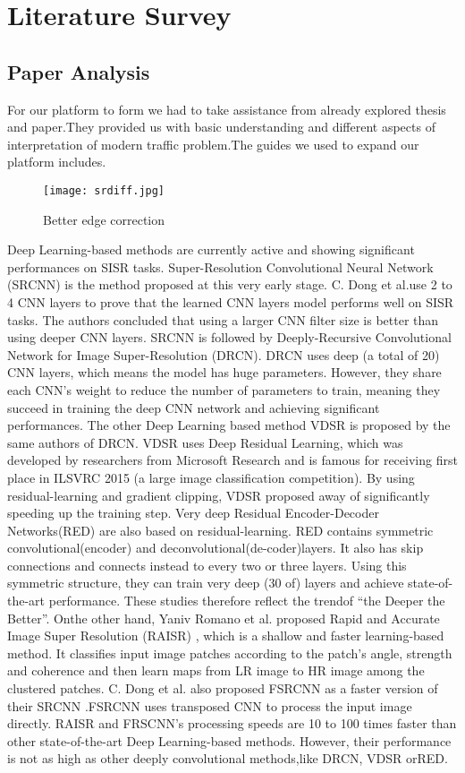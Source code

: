 \chapter{Literature Survey}

\section{Paper Analysis}
For our platform to form we had to take assistance from already explored thesis and paper.They provided us with basic understanding and different aspects of interpretation of modern traffic problem.The guides we used to expand our platform includes.

\begin{figure}[htb]
    \centering
    \texttt{[image: srdiff.jpg]}
    \caption{Better edge correction}
    \label{fig:srdiff} %
\end{figure}

Deep Learning-based methods are currently active and showing significant performances on SISR tasks. Super-Resolution Convolutional Neural Network (SRCNN) is the method proposed at this very early stage. C. Dong et al.use 2 to 4 CNN layers to prove that the learned CNN layers model performs well on SISR tasks. The authors concluded that using a larger CNN filter size is better than using deeper CNN layers. SRCNN is followed by Deeply-Recursive Convolutional Network for Image Super-Resolution (DRCN). DRCN uses deep (a total of 20) CNN layers, which means the model has huge parameters. However, they share each CNN’s weight to reduce the number of parameters to train, meaning they succeed in training the deep CNN network and achieving significant performances. The other Deep Learning based method VDSR is proposed by the same authors of DRCN. VDSR uses Deep Residual Learning, which was developed by researchers from Microsoft Research and is famous for receiving first place in ILSVRC 2015 (a large image classification competition). By using residual-learning and gradient clipping, VDSR proposed away of significantly speeding up the training step. Very deep Residual Encoder-Decoder Networks(RED) are also based on residual-learning. RED contains symmetric convolutional(encoder) and deconvolutional(de-coder)layers. It also has skip connections and connects instead to every two or three layers. Using this symmetric structure, they can train very deep (30 of) layers and achieve state-of-the-art performance. These studies therefore reflect the trendof “the Deeper the Better”. Onthe other hand, Yaniv Romano et al. proposed Rapid and Accurate Image Super Resolution (RAISR) , which is a shallow and faster learning-based method. It classifies input image patches according to the patch’s angle, strength and coherence and then learn maps from LR image to HR image among the clustered patches. C. Dong et al. also proposed FSRCNN as a faster version of their SRCNN .FSRCNN uses transposed CNN to process the input image directly. RAISR and FRSCNN’s processing speeds are 10 to 100 times faster than other state-of-the-art Deep Learning-based methods. However, their performance is not as high as other deeply convolutional methods,like DRCN, VDSR orRED.

